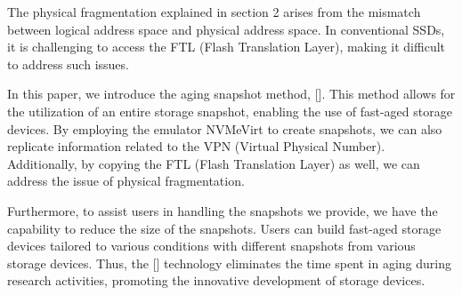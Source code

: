 The physical fragmentation explained in section 2 arises from the mismatch between logical address space and physical address space.
In conventional SSDs, it is challenging to access the FTL (Flash Translation Layer), making it difficult to address such issues.

In this paper, we introduce the aging snapshot method, [].
This method allows for the utilization of an entire storage snapshot, enabling the use of fast-aged storage devices.
By employing the emulator NVMeVirt to create snapshots, we can also replicate information related to the VPN (Virtual Physical Number).
Additionally, by copying the FTL (Flash Translation Layer) as well, we can address the issue of physical fragmentation.

Furthermore, to assist users in handling the snapshots we provide, we have the capability to reduce the size of the snapshots.
Users can build fast-aged storage devices tailored to various conditions with different snapshots from various storage devices.
Thus, the [] technology eliminates the time spent in aging during research activities, promoting the innovative development of storage devices.

